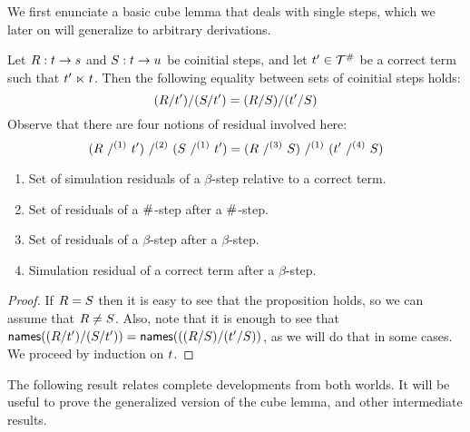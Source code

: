We first enunciate a basic cube lemma that deals with single steps,
which we later on will generalize to arbitrary derivations.

\begin{lemma}
Let $R : t \to s$ and $S : t \to u$ be coinitial steps,
and let $t' \in \mathcal{T}^{\mathtt{\#}}$ be a correct term such that $t' \mathrel{\ltimes} t$.
Then the following equality between sets of coinitial steps holds:
\[
  (R/t')/(S/t') = (R/S)/(t'/S)
\]
Observe that there are four notions of residual involved here:
\[
  (\redex\ /^{(1)}\ \tm')\ /^{(2)}\ (\redextwo\ /^{(1)}\ \tm') = (\redex\ /^{(3)}\ \redextwo)\ /^{(1)}\ (\tm'\ /^{(4)}\ \redextwo)
\]
\begin{enumerate}
\item Set of simulation residuals of a $\beta$-step relative to a correct term.
\item Set of residuals of a $\mathtt{\#}$-step after a $\mathtt{\#}$-step.
\item Set of residuals of a $\beta$-step after a $\beta$-step.
\item Simulation residual of a correct term after a $\beta$-step.
\end{enumerate}
\end{lemma}
\begin{proof}
If $R = S$ then it is easy to see that the proposition holds, so we can assume that $R \neq S$.
  Also, note that it is enough to see that $\mathsf{names}((R/t')/(S/t')) = \mathsf{names}(((R/S)/(t'/S))$, as we will do that in some cases.
We proceed by induction on $t$.
\end{proof}

The following result relates complete developments from both worlds. It will be
useful to prove the generalized version of the cube lemma, and other intermediate results.


